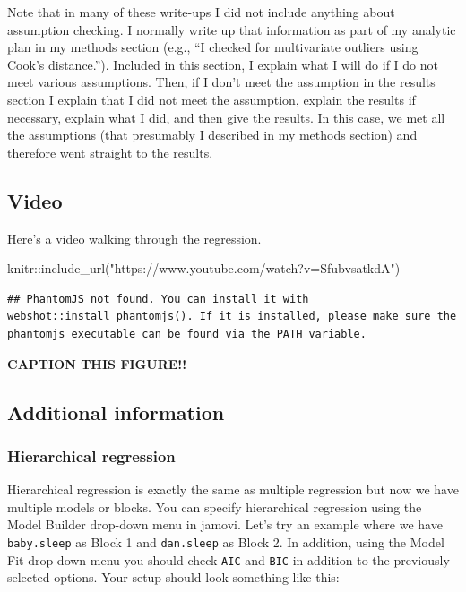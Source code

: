 \documentclass[
]{book}
\newenvironment{Shaded}{\begin{snugshade}}{\end{snugshade}}
\newcommand{\FunctionTok}[1]{\textcolor[rgb]{0.00,0.00,0.00}{#1}}
\newcommand{\NormalTok}[1]{#1}
\newcommand{\SpecialCharTok}[1]{\textcolor[rgb]{0.00,0.00,0.00}{#1}}
\newcommand{\StringTok}[1]{\textcolor[rgb]{0.31,0.60,0.02}{#1}}
\begin{document}
Note that in many of these write-ups I did not include anything about assumption checking. I normally write up that information as part of my analytic plan in my methods section (e.g., ``I checked for multivariate outliers using Cook's distance.''). Included in this section, I explain what I will do if I do not meet various assumptions. Then, if I don't meet the assumption in the results section I explain that I did not meet the assumption, explain the results if necessary, explain what I did, and then give the results. In this case, we met all the assumptions (that presumably I described in my methods section) and therefore went straight to the results.

\hypertarget{video-10}{%
\subsection{Video}\label{video-10}}

Here's a video walking through the regression.

\begin{Shaded}
\begin{Highlighting}[]
\NormalTok{knitr}\SpecialCharTok{::}\FunctionTok{include\_url}\NormalTok{(}\StringTok{"https://www.youtube.com/watch?v=SfubvsatkdA"}\NormalTok{)}
\end{Highlighting}
\end{Shaded}

\begin{verbatim}
## PhantomJS not found. You can install it with webshot::install_phantomjs(). If it is installed, please make sure the phantomjs executable can be found via the PATH variable.
\end{verbatim}

\label{fig:unnamed-chunk-5}\textbf{CAPTION THIS FIGURE!!}

\hypertarget{additional-information-5}{%
\subsection{Additional information}\label{additional-information-5}}

\hypertarget{hierarchical-regression}{%
\subsubsection{Hierarchical regression}\label{hierarchical-regression}}

Hierarchical regression is exactly the same as multiple regression but now we have multiple models or blocks. You can specify hierarchical regression using the Model Builder drop-down menu in jamovi. Let's try an example where we have \texttt{baby.sleep} as Block 1 and \texttt{dan.sleep} as Block 2. In addition, using the Model Fit drop-down menu you should check \texttt{AIC} and \texttt{BIC} in addition to the previously selected options. Your setup should look something like this:
\end{document}
